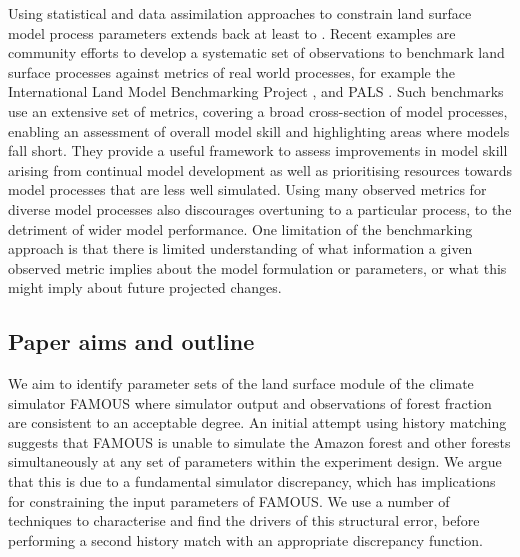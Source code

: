 \documentclass[esd, article]{copernicus} %
\begin{document}
Using statistical and data assimilation approaches to constrain land surface model process parameters extends back at least to \cite{sellers1996revised}. Recent examples are community efforts to develop a systematic set of observations to benchmark land surface processes against metrics of real world processes, for example the International Land Model Benchmarking Project \citep{luo2012framework}, and PALS \citep{abramowitz2012benchmarking}.  Such benchmarks use an extensive set of metrics, covering a broad cross-section of model processes, enabling an assessment of overall model skill and highlighting areas where models fall short. They provide a useful framework to assess improvements in model skill arising from continual model development as well as prioritising resources towards model processes that are less well simulated.  Using many observed metrics for diverse model processes also discourages overtuning to a particular process, to the detriment of wider model performance. One limitation of the benchmarking approach is that there is limited understanding of what information a given observed metric implies about the model formulation or parameters, or what this might imply about future projected changes.

\subsection{Paper aims and outline}

We aim to identify parameter sets of the land surface module of the climate simulator FAMOUS where simulator output and observations of forest fraction are consistent to an acceptable degree.  An initial attempt using history matching suggests that FAMOUS is unable to simulate the Amazon forest and other forests simultaneously at any set of parameters within the experiment design. We argue that this is due to a fundamental simulator discrepancy, which has implications for constraining the input parameters of FAMOUS. We use a number of techniques to characterise and find the drivers of this structural error, before performing a second history match with an appropriate discrepancy function.
\end{document}
